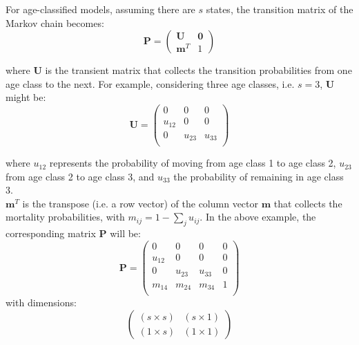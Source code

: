 \begin{figure}[H]
\centering
{}
\end{figure}

For age-classified models, assuming there are $s$ states, the transition matrix of the Markov chain becomes:
\begin{equation}
    \mathbf{P} = \begin{pmatrix}
        \mathbf{U} &  \mathbf{0}\\
    \mathbf{m}^T& 1
    \end{pmatrix}
\end{equation}

where $\mathbf{U}$ is the transient matrix that collects the transition probabilities from one age class to the next. For example, considering three age classes, i.e. $s = 3$, $\mathbf{U}$ might be:
\begin{equation}
    \mathbf{U}= \begin{pmatrix}
    0 & 0 & 0\\
    u_{12} & 0 & 0\\
0 & u_{23} & u_{33}\\
    \end{pmatrix}
\end{equation}

where $ u_{12}$ represents the probability of moving from age class 1 to age class 2, $ u_{23}$ from age class 2 to age class 3, and $ u_{33}$ the probability of remaining in age class 3.\\
$ \mathbf{m}^T$ is the transpose (i.e. a row vector) of the column vector $\mathbf{m}$ that collects the mortality probabilities, with $m_{ij} = 1 - \sum_{j} u_{ij}$. 
In the above example, the corresponding matrix $\mathbf{P}$ will be:
\begin{equation}
    \mathbf{P}= \begin{pmatrix}
    0 & 0 & 0 & 0\\
    u_{12} & 0 & 0& 0\\
0 & u_{23} & u_{33}& 0\\
m_{14} & m_{24} & m_{34}& 1\\
    \end{pmatrix}
\end{equation}
with dimensions:
\begin{equation}
\begin{pmatrix}
    (s \times s) &  (s \times 1)\\
    (1 \times s) & (1 \times 1)
\end{pmatrix}
\end{equation}

